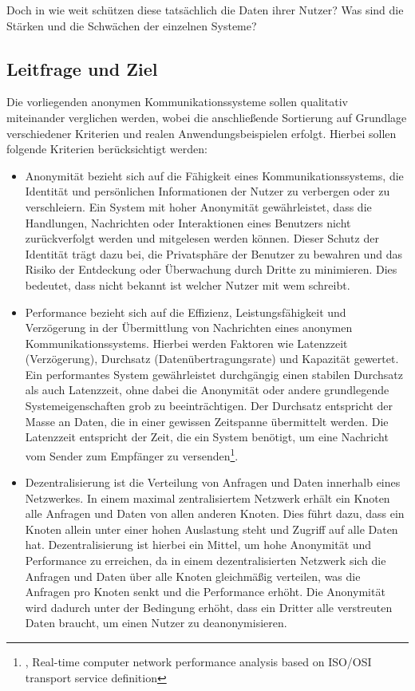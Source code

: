Doch in wie weit schützen diese tatsächlich die Daten ihrer Nutzer? Was sind die Stärken und die Schwächen der einzelnen Systeme? 

\subsection{Leitfrage und Ziel}

Die vorliegenden anonymen Kommunikationssysteme sollen qualitativ miteinander verglichen werden, wobei die anschließende Sortierung auf Grundlage verschiedener Kriterien und realen Anwendungsbeispielen erfolgt. Hierbei sollen folgende Kriterien berücksichtigt werden:

\begin{itemize}

\item Anonymität bezieht sich auf die Fähigkeit eines Kommunikationssystems, die Identität und persönlichen Informationen der Nutzer zu verbergen oder zu verschleiern. Ein System mit hoher Anonymität gewährleistet, dass die Handlungen, Nachrichten oder Interaktionen eines Benutzers nicht zurückverfolgt werden und mitgelesen werden können. Dieser Schutz der Identität trägt dazu bei, die Privatsphäre der Benutzer zu bewahren und das Risiko der Entdeckung oder Überwachung durch Dritte zu minimieren. Dies bedeutet, dass nicht bekannt ist welcher Nutzer mit wem schreibt.

\item Performance bezieht sich auf die Effizienz, Leistungsfähigkeit und Verzögerung in der Übermittlung von Nachrichten eines anonymen Kommunikationssystems. Hierbei werden Faktoren wie Latenzzeit (Verzögerung), Durchsatz (Datenübertragungsrate) und Kapazität gewertet. Ein performantes System gewährleistet durchgängig einen stabilen Durchsatz als auch Latenzzeit, ohne dabei die Anonymität oder andere grundlegende Systemeigenschaften grob zu beeinträchtigen. Der Durchsatz entspricht der Masse an Daten, die in einer gewissen Zeitspanne übermittelt werden. Die Latenzzeit entspricht der Zeit, die ein System benötigt, um eine Nachricht vom Sender zum Empfänger zu versenden\footnote{\cite{ComputerNetworkPerformanceAnalysis}, Real-time computer network performance analysis based on ISO/OSI transport service definition}.

\item Dezentralisierung ist die Verteilung von Anfragen und Daten innerhalb eines Netzwerkes. In einem maximal zentralisiertem Netzwerk erhält ein Knoten alle Anfragen und Daten von allen anderen Knoten. Dies führt dazu, dass ein Knoten allein unter einer hohen Auslastung steht und Zugriff auf alle Daten hat. Dezentralisierung ist hierbei ein Mittel, um hohe Anonymität und Performance zu erreichen, da in einem dezentralisierten Netzwerk sich die Anfragen und Daten über alle Knoten gleichmäßig verteilen, was die Anfragen pro Knoten senkt und die Performance erhöht. Die Anonymität wird dadurch unter der Bedingung erhöht, dass ein Dritter alle verstreuten Daten braucht, um einen Nutzer zu deanonymisieren.


\end{itemize}

